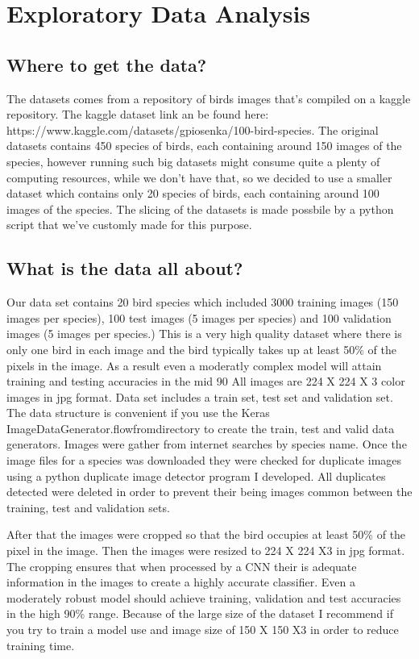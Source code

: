 \section{Exploratory Data Analysis}

\subsection{Where to get the data?}
The datasets comes from a repository of birds images that's compiled on a kaggle repository. The kaggle dataset link an be found here: https://www.kaggle.com/datasets/gpiosenka/100-bird-species. The original datasets contains 450 species of birds, each containing around 150 images of the species, however running such big datasets might consume quite a plenty of computing resources, while we don't have that, so we decided to use a smaller dataset which contains only 20 species of birds, each containing around 100 images of the species. The slicing of the datasets is made possbile by a python script that we've customly made for this purpose. 

\subsection{What is the data all about?}
Our data set contains 20 bird species which included 3000 training images (150 images per species), 100 test images (5 images per species) and 100 validation images (5 images per species.) This is a very high quality dataset where there is only one bird in each image and the bird typically takes up at least 50\% of the pixels in the image. As a result even a moderatly complex model will attain training and testing accuracies in the mid 90%
All images are 224 X 224 X 3 color images in jpg format. Data set includes a train set, test set and validation set. The data structure is convenient if you use the Keras ImageDataGenerator.flowfromdirectory to create the train, test and valid data generators.
Images were gather from internet searches by species name. Once the image files for a species was downloaded they were checked for duplicate images using a python duplicate image detector program I developed. All duplicates detected were deleted in order to prevent their being images common between the training, test and validation sets.

After that the images were cropped so that the bird occupies at least 50\% of the pixel in the image. Then the images were resized to 224 X 224 X3 in jpg format. The cropping ensures that when processed by a CNN their is adequate information in the images to create a highly accurate classifier. Even a moderately robust model should achieve training, validation and test accuracies in the high 90\% range. Because of the large size of the dataset I recommend if you try to train a model use and image size of 150 X 150 X3 in order to reduce training time. 

